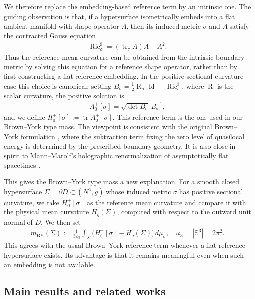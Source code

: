 \documentclass[10pt]{amsart}
\newcommand{\Sph}{\mathbb{S}}
\newcommand{\tr}{\operatorname{tr}}
\newcommand{\Ric}{\operatorname{Ric}}
\newcommand{\Id}{\operatorname{Id}}
\newcommand{\Scal}{\operatorname{R}}
\newcommand{\BY}{\mathrm{BY}}
\theoremstyle{plain}
\theoremstyle{remark}
\begin{document}
	We therefore replace the embedding-based reference term by an intrinsic one.
	The guiding observation is that, if a hypersurface isometrically embeds into a
	flat ambient manifold with shape operator $A$, then its induced metric $\sigma$
	and $A$ satisfy the contracted Gauss equation
	\begin{align*}
		\Ric_\sigma^\sharp
		=
		(\tr_\sigma A)A-A^2 .
	\end{align*}
	Thus the reference mean curvature can be obtained from the intrinsic
	boundary metric by solving this equation for a reference shape operator, rather
	than by first constructing a flat reference embedding. In the positive sectional
	curvature case this choice is canonical: setting
	$B_\sigma=\frac12\Scal_\sigma\Id-\Ric_\sigma^\sharp$, where $\Scal$ is the scalar curvature, the positive solution is
	\begin{align*}
		A_0^+[\sigma]
		=
		\sqrt{\det B_\sigma}\,B_\sigma^{-1},
	\end{align*}
	and we define $H_0^+[\sigma]:=\tr A_0^+[\sigma]$. This reference term is the one
	used in our Brown--York type mass. The viewpoint is consistent with the original
	Brown--York formulation \cite{BrownYork}, where the subtraction term fixing the
	zero level of quasilocal energy is determined by the prescribed boundary
	geometry. It is also close in spirit to Mann--Marolf's holographic
	renormalization of asymptotically flat spacetimes \cite{MannMarolf}.
	
	This gives the Brown--York type mass a new explanation. For a smooth closed
	hypersurface $\Sigma=\partial D\subset (N^4,g)$ whose induced metric
	$\sigma$ has positive sectional curvature, we take
	$H_0^+[\sigma]$ as the reference mean curvature and compare
	it with the physical mean curvature $H_g(\Sigma)$, computed with respect to
	the outward unit normal of $D$. We then set
	\begin{align}\label{eq:Brown-York-type-mass-introduction}
		m_{\BY}(\Sigma)
		:=
		\frac{1}{3\omega_3}
		\int_\Sigma
		\bigl(
		H_0^+[\sigma]-H_g(\Sigma)
		\bigr)\,d\mu_\sigma,
		\quad
		\omega_3=|\Sph^3|=2\pi^2 .
	\end{align}
	This agrees with the usual Brown--York reference term whenever a
	flat reference hypersurface exists. Its advantage is that it remains meaningful even when such an
	embedding is not available.
	
	\subsection{Main results and related works}
	
\end{document}
